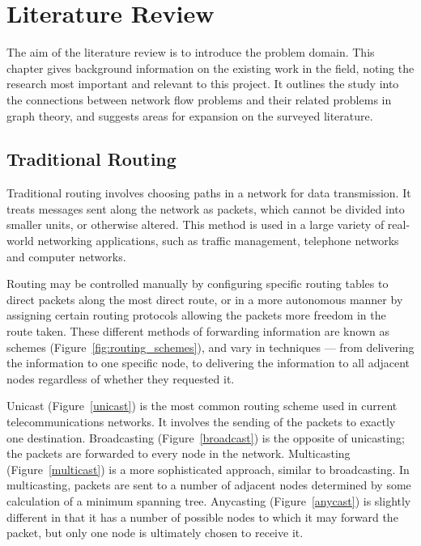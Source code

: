 
\chapter{Literature Review}
\label{ch:litrev}

The aim of the literature review is to introduce the problem domain. This chapter gives background information on the existing work in the field, noting the research most important and relevant to this project. It outlines the study into the connections between network flow problems and their related problems in graph theory, and suggests areas for expansion on the surveyed literature.

\section{Traditional Routing}
\label{sect:routing}

Traditional routing involves choosing paths in a network for data transmission. It treats messages sent along the network as packets, which cannot be divided into smaller units, or otherwise altered. This method is used in a large variety of real-world networking applications, such as traffic management, telephone networks and computer networks.

Routing may be controlled manually by configuring specific routing tables to direct packets along the most direct route, or in a more autonomous manner by assigning certain routing protocols allowing the packets more freedom in the route taken. These different methods of forwarding information are known as schemes (Figure~\ref{fig:routing_schemes}), and vary in techniques --- from delivering the information to one specific node, to delivering the information to all adjacent nodes regardless of whether they requested it.

Unicast (Figure~\ref{unicast}) is the most common routing scheme used in current telecommunications networks. It involves the sending of the packets to exactly one destination. Broadcasting (Figure~\ref{broadcast}) is the opposite of unicasting; the packets are forwarded to every node in the network. Multicasting (Figure~\ref{multicast}) is a more sophisticated approach, similar to broadcasting. In multicasting, packets are sent to a number of adjacent nodes determined by some calculation of a minimum spanning tree. Anycasting (Figure~\ref{anycast}) is slightly different in that it has a number of possible nodes to which it may forward the packet, but only one node is ultimately chosen to receive it.

